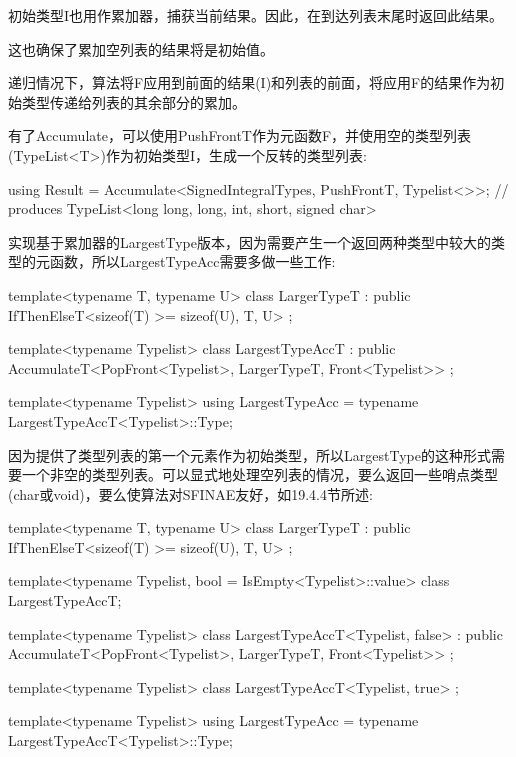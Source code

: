 初始类型I也用作累加器，捕获当前结果。因此，在到达列表末尾时返回此结果。

\begin{notice}这也确保了累加空列表的结果将是初始值。
\end{notice}

递归情况下，算法将F应用到前面的结果(I)和列表的前面，将应用F的结果作为初始类型传递给列表的其余部分的累加。

有了Accumulate，可以使用PushFrontT作为元函数F，并使用空的类型列表(TypeList<T>)作为初始类型I，生成一个反转的类型列表:

\begin{cpp}
using Result = Accumulate<SignedIntegralTypes, PushFrontT, Typelist<>>;
				// produces TypeList<long long, long, int, short, signed char>
\end{cpp}

实现基于累加器的LargestType版本，因为需要产生一个返回两种类型中较大的类型的元函数，所以LargestTypeAcc需要多做一些工作:

\begin{cpp}
template<typename T, typename U>
class LargerTypeT
: public IfThenElseT<sizeof(T) >= sizeof(U), T, U>
{
};

template<typename Typelist>
class LargestTypeAccT
: public AccumulateT<PopFront<Typelist>, LargerTypeT,
Front<Typelist>>
{
};

template<typename Typelist>
using LargestTypeAcc = typename LargestTypeAccT<Typelist>::Type;
\end{cpp}

因为提供了类型列表的第一个元素作为初始类型，所以LargestType的这种形式需要一个非空的类型列表。可以显式地处理空列表的情况，要么返回一些哨点类型(char或void)，要么使算法对SFINAE友好，如19.4.4节所述:

\begin{cpp}
template<typename T, typename U>
class LargerTypeT
: public IfThenElseT<sizeof(T) >= sizeof(U), T, U>
{
};

template<typename Typelist, bool = IsEmpty<Typelist>::value>
class LargestTypeAccT;

template<typename Typelist>
class LargestTypeAccT<Typelist, false>
: public AccumulateT<PopFront<Typelist>, LargerTypeT,
					Front<Typelist>>
{
};

template<typename Typelist>
class LargestTypeAccT<Typelist, true>
{
};

template<typename Typelist>
using LargestTypeAcc = typename LargestTypeAccT<Typelist>::Type;
\end{cpp}

